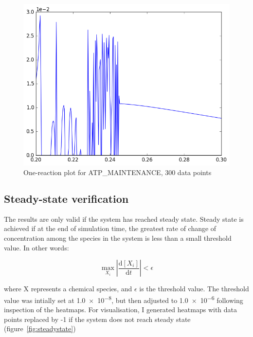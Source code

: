 \documentclass[parskip=full]{scrreprt}
\begin{document}
\begin{figure}[htbp]
  \centering
  \includegraphics[scale=0.5]{atpmaintenanceonereac}
  \caption{One-reaction plot for ATP\_MAINTENANCE, 300 data points}
  \label{fig:atpmaintenanceonereac}
\end{figure}

\subsection{Steady-state verification}
\label{ssec:steadystate}

The results are only valid if the system has reached steady state. Steady state is achieved if at the end of simulation time, the greatest rate of change of concentration among the species in the system is less than a small threshold value. In other words:

\[
  \max_{X_{i}} \left | \frac{\mathrm{d}[X_{i}]}{\mathrm{d}t} \right | < \epsilon
\]

where X represents a chemical species, and $\epsilon$ is the threshold value. The threshold value was intially set at \num{1.0e-8}, but then adjusted to \num{1.0e-6} following inspection of the heatmaps. For  visualisation, I generated heatmaps with data points replaced by -1 if the system does not reach steady state (figure~\ref{fig:steadystate})
\end{document}
